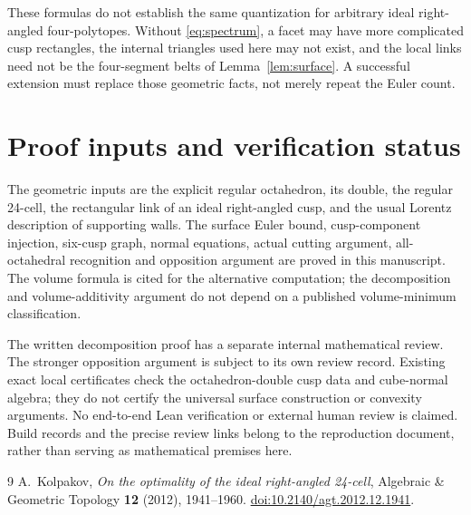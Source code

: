 \documentclass[11pt]{article}
\theoremstyle{remark}
\begin{document}
These formulas do not establish the same quantization for arbitrary
ideal right-angled four-polytopes. Without
\eqref{eq:spectrum}, a facet may have more complicated cusp
rectangles, the internal triangles used here may not exist, and
the local links need not be the four-segment belts of
Lemma~\ref{lem:surface}. A successful extension must replace those
geometric facts, not merely repeat the Euler count.

\appendix
\section{Proof inputs and verification status}

The geometric inputs are the explicit regular octahedron, its
double, the regular 24-cell, the rectangular link of an ideal
right-angled cusp, and the usual Lorentz description of supporting
walls. The surface Euler bound, cusp-component injection, six-cusp
graph, normal equations, actual cutting argument, all-octahedral
recognition and opposition argument are proved in this manuscript.
The volume formula is cited for the alternative computation; the
decomposition and volume-additivity argument do not depend on a
published volume-minimum classification.

The written decomposition proof has a separate internal mathematical
review. The stronger opposition argument is subject to its own review
record. Existing exact local certificates check the octahedron-double
cusp data and cube-normal algebra; they do not certify the universal
surface construction or convexity arguments. No end-to-end Lean
verification or external human review is claimed. Build records and
the precise review links belong to the reproduction document, rather
than serving as mathematical premises here.

\begin{thebibliography}{9}
A.~Kolpakov, \emph{On the optimality of the ideal right-angled 24-cell},
Algebraic \& Geometric Topology \textbf{12} (2012), 1941--1960.
\href{https://doi.org/10.2140/agt.2012.12.1941}{doi:10.2140/agt.2012.12.1941}.
\end{thebibliography}
\end{document}
